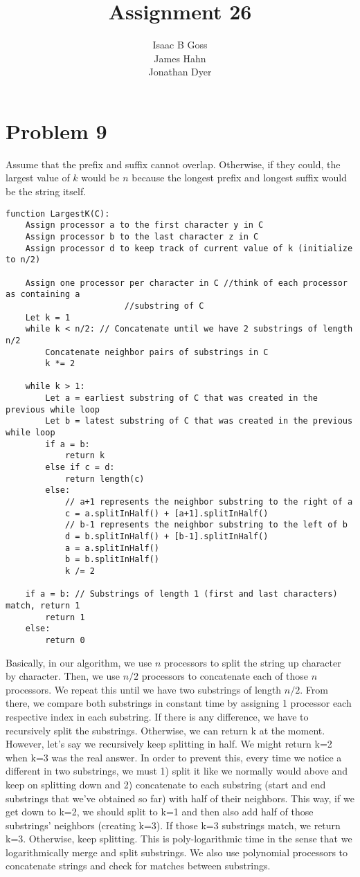 \documentclass{article}
\author{Isaac B Goss\\ James Hahn\\ Jonathan Dyer}
\title{Assignment 26}
\providecommand{\prob}[1]{\section*{Problem #1}}
\providecommand{\image}[1]{
    \begin{center}
        \includegraphics%
            {#1}
    \end{center}
}
\begin{document}
\maketitle

\prob{9}
Assume that the prefix and suffix cannot overlap.  Otherwise, if they could, the largest value of $k$ would be $n$ because the longest prefix and longest suffix would be the string itself.\\

\begin{lstlisting}
function LargestK(C):
	Assign processor a to the first character y in C
	Assign processor b to the last character z in C
	Assign processor d to keep track of current value of k (initialize to n/2)
	
	Assign one processor per character in C //think of each processor as containing a 
						//substring of C
	Let k = 1
	while k < n/2: // Concatenate until we have 2 substrings of length n/2
		Concatenate neighbor pairs of substrings in C
		k *= 2
	
	while k > 1:
		Let a = earliest substring of C that was created in the previous while loop
		Let b = latest substring of C that was created in the previous while loop
		if a = b:
			return k
		else if c = d:
			return length(c)
		else:
			// a+1 represents the neighbor substring to the right of a
			c = a.splitInHalf() + [a+1].splitInHalf()
			// b-1 represents the neighbor substring to the left of b
			d = b.splitInHalf() + [b-1].splitInHalf()
			a = a.splitInHalf()
			b = b.splitInHalf()
			k /= 2
			
	if a = b: // Substrings of length 1 (first and last characters) match, return 1
		return 1
	else:
		return 0
\end{lstlisting}


Basically, in our algorithm, we use $n$ processors to split the string up character by character.  Then, we use $n/2$ processors to concatenate each of those $n$ processors.  We repeat this until we have two substrings of length $n/2$.  From there, we compare both substrings in constant time by assigning 1 processor each respective index in each substring.  If there is any difference, we have to recursively split the substrings.  Otherwise, we can return k at the moment.  However, let's say we recursively keep splitting in half.  We might return k=2 when k=3 was the real answer.  In order to prevent this, every time we notice a different in two substrings, we must 1) split it like we normally would above and keep on splitting down and 2) concatenate to each substring (start and end substrings that we've obtained so far) with half of their neighbors.  This way, if we get down to k=2, we should split to k=1 and then also add half of those substrings' neighbors (creating k=3).  If those k=3 substrings match, we return k=3.  Otherwise, keep splitting.  This is poly-logarithmic time in the sense that we logarithmically merge and split substrings.  We also use polynomial processors to concatenate strings and check for matches between substrings.
\end{document}
